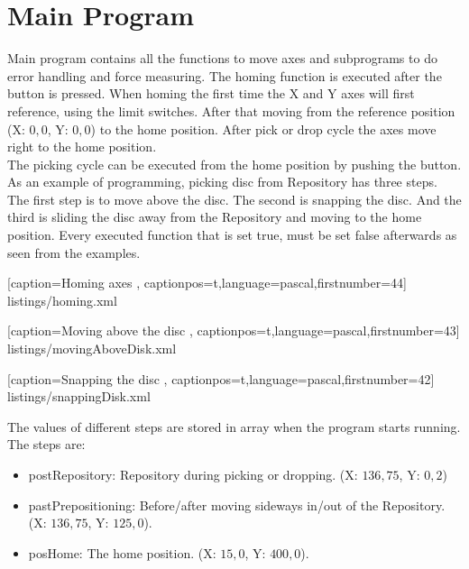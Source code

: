 \documentclass[a4paper,12pt]{scrreprt}
\begin{document}
\section{Main Program}
Main program contains all the functions to move axes and subprograms to do error handling and force measuring. The homing function is executed after the button is pressed. When homing the first time the X and Y axes will first reference, using the limit switches. After that moving from the reference position (X: $0,0$, Y: $0,0$) to the home position. After pick or drop cycle the axes move right to the home position.\\
The picking cycle can be executed from the home position by pushing the button. As an example of programming, picking disc from \acs{Repository} has three steps. The first step is to move above the disc.  The second is snapping the disc. And the third is sliding the disc away from the \acs{Repository} and moving to the home position. Every executed function that is set true, must be set false afterwards as seen from the examples.\\

 
    [caption={Homing axes}
       \label{lst:istate15-21},
       captionpos=t,language=pascal,firstnumber=44]
       {listings/homing.xml}
       
        
    [caption={Moving above the disc}
       \label{lst:moving above the disc},
       captionpos=t,language=pascal,firstnumber=43]
 {listings/movingAboveDisk.xml}
 
  
    [caption={Snapping the disc}
       \label{lst:snapping the disc},
       captionpos=t,language=pascal,firstnumber=42]
 {listings/snappingDisk.xml}

The values of different steps are stored in array when the program starts running. The steps are:
\begin{itemize}
\item postRepository: \acs{Repository} during picking or dropping. (X: $136,75$, Y: $0,2$)
\item pastPrepositioning: Before/after moving sideways in/out of the \acs{Repository}. (X: $136,75$, Y: $125,0$).
\item posHome: The home position. (X: $15,0$, Y: $400,0$).
\end{itemize}
\end{document}

